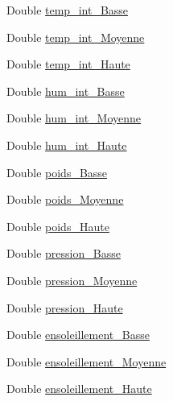 \begin{DoxyCompactItemize}
\item 
Double \hyperlink{classfr_1_1campus_1_1laurainc_1_1honeybee_1_1_ruche_a09b3b4f5f23736064df7d6dd245d1210}{temp\+\_\+int\+\_\+\+Basse}
\item 
Double \hyperlink{classfr_1_1campus_1_1laurainc_1_1honeybee_1_1_ruche_a99bf4c97fe3710861e0a730cc0010bfb}{temp\+\_\+int\+\_\+\+Moyenne}
\item 
Double \hyperlink{classfr_1_1campus_1_1laurainc_1_1honeybee_1_1_ruche_af50a9a4e5305bd1cd439e5071ed31c9c}{temp\+\_\+int\+\_\+\+Haute}
\item 
Double \hyperlink{classfr_1_1campus_1_1laurainc_1_1honeybee_1_1_ruche_a5d7949f1f6daa28454a0a5468faab337}{hum\+\_\+int\+\_\+\+Basse}
\item 
Double \hyperlink{classfr_1_1campus_1_1laurainc_1_1honeybee_1_1_ruche_a8edae192f1f8c4578d321f4b2129cc8a}{hum\+\_\+int\+\_\+\+Moyenne}
\item 
Double \hyperlink{classfr_1_1campus_1_1laurainc_1_1honeybee_1_1_ruche_ac6b4da59e8ad8537926cc4ca7a6d4746}{hum\+\_\+int\+\_\+\+Haute}
\item 
Double \hyperlink{classfr_1_1campus_1_1laurainc_1_1honeybee_1_1_ruche_ae321c3f7e1f6df6ee69dae4eac5eff1b}{poids\+\_\+\+Basse}
\item 
Double \hyperlink{classfr_1_1campus_1_1laurainc_1_1honeybee_1_1_ruche_a972036ada9b7e6b927d354c37351a41b}{poids\+\_\+\+Moyenne}
\item 
Double \hyperlink{classfr_1_1campus_1_1laurainc_1_1honeybee_1_1_ruche_a9bfa63b9e5d815d16e07231065f8f31e}{poids\+\_\+\+Haute}
\item 
Double \hyperlink{classfr_1_1campus_1_1laurainc_1_1honeybee_1_1_ruche_a195271425f165de0607902f1c76a235a}{pression\+\_\+\+Basse}
\item 
Double \hyperlink{classfr_1_1campus_1_1laurainc_1_1honeybee_1_1_ruche_afcfb5de514add7b23ac40ecf0913ba0f}{pression\+\_\+\+Moyenne}
\item 
Double \hyperlink{classfr_1_1campus_1_1laurainc_1_1honeybee_1_1_ruche_a5218589d82413783a85b71a8f765e565}{pression\+\_\+\+Haute}
\item 
Double \hyperlink{classfr_1_1campus_1_1laurainc_1_1honeybee_1_1_ruche_a715ecfaedd6f31a078667e7f67348666}{ensoleillement\+\_\+\+Basse}
\item 
Double \hyperlink{classfr_1_1campus_1_1laurainc_1_1honeybee_1_1_ruche_af3da6a0f98d377ec6633f40a8c0e5c99}{ensoleillement\+\_\+\+Moyenne}
\item 
Double \hyperlink{classfr_1_1campus_1_1laurainc_1_1honeybee_1_1_ruche_a3b55f2c08cef225db52991e4023201c7}{ensoleillement\+\_\+\+Haute}

\end{DoxyCompactItemize}
